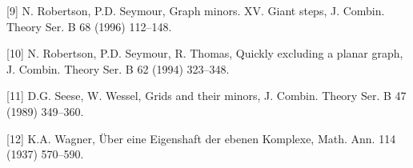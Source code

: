 [9] N. Robertson, P.D. Seymour, Graph minors. XV. Giant steps, J. Combin. Theory Ser. B 68 (1996) 112--148.

[10] N. Robertson, P.D. Seymour, R. Thomas, Quickly excluding a planar graph, J. Combin. Theory Ser. B 62 (1994) 323--348.

[11] D.G. Seese, W. Wessel, Grids and their minors, J. Combin. Theory Ser. B 47 (1989) 349--360.

[12] K.A. Wagner, \"Uber eine Eigenshaft der ebenen Komplexe, Math. Ann. 114 (1937) 570--590.
